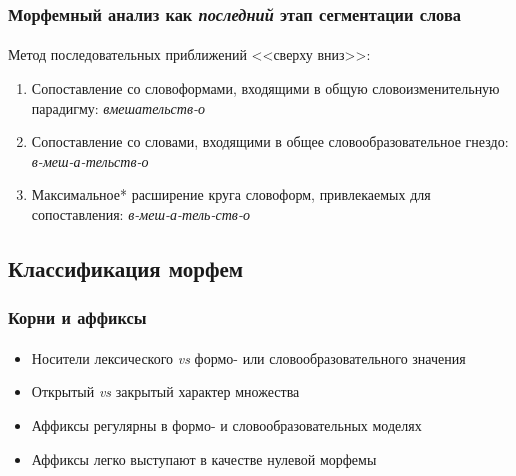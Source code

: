 \begin{frame}
    \frametitle{Морфемный анализ как \textit{последний} этап сегментации слова}
    \framesubtitle{\autocites{bogdanov:1997}[38]{plungyan:2003}}

    Метод последовательных приближений <<сверху вниз>>:
    \begin{enumerate}
        \item Сопоставление со словоформами, входящими в общую словоизменительную парадигму: \textit{вмешательств-о}~
        \item Сопоставление со словами, входящими в общее словообразовательное гнездо: \textit{в-меш-а-тельств-о}
        \item Максимальное* расширение круга словоформ, привлекаемых для сопоставления: \textit{в-меш-а-тель-ств-о}
    \end{enumerate}

\end{frame}

\subsection{Классификация морфем}


\begin{frame}
    \frametitle{Корни и аффиксы}
    \framesubtitle{\autocite[13--14]{zubova_menshikova:2014}}

    \begin{itemize}
        \item Носители лексического \textit{vs} формо- или словообразовательного значения
        \item Открытый \textit{vs} закрытый характер множества
        \item Аффиксы регулярны в формо- и словообразовательных моделях
        \item Аффиксы легко выступают в качестве нулевой морфемы
    \end{itemize}
\end{frame}

